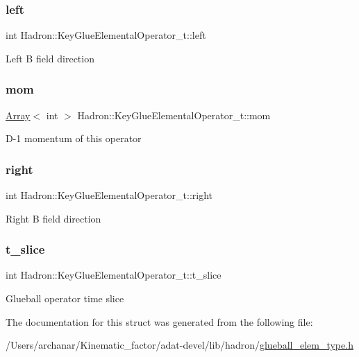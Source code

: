 \subsubsection{\texorpdfstring{left}{left}}
{\footnotesize\ttfamily int Hadron\+::\+Key\+Glue\+Elemental\+Operator\+\_\+t\+::left}

Left B field direction \mbox{\label{structHadron_1_1KeyGlueElementalOperator__t_acc0e7e9420491261bf7c7199ae522664}} 
\subsubsection{\texorpdfstring{mom}{mom}}
{\footnotesize\ttfamily \mbox{\hyperlink{classXMLArray_1_1Array}{Array}}$<$ int $>$ Hadron\+::\+Key\+Glue\+Elemental\+Operator\+\_\+t\+::mom}

D-\/1 momentum of this operator \mbox{\label{structHadron_1_1KeyGlueElementalOperator__t_a81292d0ee6bd97ac66b0f100c94b1010}} 
\subsubsection{\texorpdfstring{right}{right}}
{\footnotesize\ttfamily int Hadron\+::\+Key\+Glue\+Elemental\+Operator\+\_\+t\+::right}

Right B field direction \mbox{\label{structHadron_1_1KeyGlueElementalOperator__t_a678f4b074f03c2acbedf72f3458fbbb6}} 
\subsubsection{\texorpdfstring{t\_slice}{t\_slice}}
{\footnotesize\ttfamily int Hadron\+::\+Key\+Glue\+Elemental\+Operator\+\_\+t\+::t\+\_\+slice}

Glueball operator time slice 

The documentation for this struct was generated from the following file\+:\begin{DoxyCompactItemize}
\item 
/\+Users/archanar/\+Kinematic\+\_\+factor/adat-\/devel/lib/hadron/\mbox{\hyperlink{adat-devel_2lib_2hadron_2glueball__elem__type_8h}{glueball\+\_\+elem\+\_\+type.\+h}}\end{DoxyCompactItemize}
